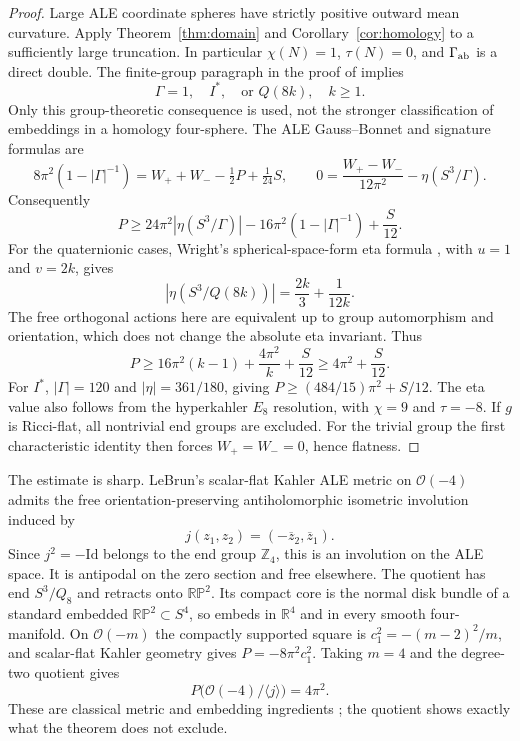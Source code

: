 \documentclass[11pt]{article}
\newcommand{\Z}{\mathbb Z}
\newcommand{\R}{\mathbb R}
\begin{document}
\begin{proof}
Large ALE coordinate spheres have strictly positive outward mean
curvature. Apply Theorem~\ref{thm:domain} and
Corollary~\ref{cor:homology} to a sufficiently large truncation.
In particular $\chi(N)=1$, $\tau(N)=0$, and $\Gamma_{\rm ab}$ is a
direct double. The finite-group paragraph in the proof of
\cite[Theorem 5.2]{Hillman} implies
\[
 \Gamma=1,\quad I^*,\quad\text{or }Q(8k),\quad k\ge1.
\]
Only this group-theoretic consequence is used, not the stronger
classification of embeddings in a homology four-sphere.
The ALE Gauss--Bonnet and signature formulas are
\[
 8\pi^2(1-|\Gamma|^{-1})=W_++W_- -\tfrac12P+\tfrac1{24}S,
 \qquad 0=\frac{W_+-W_-}{12\pi^2}-\eta(S^3/\Gamma).
\]
Consequently
\begin{equation}\label{eq:eta}
 P\ge24\pi^2|\eta(S^3/\Gamma)|
       -16\pi^2(1-|\Gamma|^{-1})+\frac{S}{12}.
\end{equation}
For the quaternionic cases, Wright's spherical-space-form eta formula
\cite[Lemma 1]{Wright}, with $u=1$ and $v=2k$, gives
\[
 |\eta(S^3/Q(8k))|=\frac{2k}{3}+\frac1{12k}.
\]
The free orthogonal actions here are equivalent up to group automorphism
and orientation, which does not change the absolute eta invariant.
Thus
\[
 P\ge16\pi^2(k-1)+\frac{4\pi^2}{k}+\frac{S}{12}
   \ge4\pi^2+\frac{S}{12}.
\]
For $I^*$, $|\Gamma|=120$ and $|\eta|=361/180$, giving
$P\ge(484/15)\pi^2+S/12$. The eta value also follows from the
hyperkahler $E_8$ resolution, with $\chi=9$ and $\tau=-8$.
If $g$ is Ricci-flat, all nontrivial end groups are excluded. For the
trivial group the first characteristic identity then forces
$W_+=W_-=0$, hence flatness.
\end{proof}

The estimate is sharp. LeBrun's scalar-flat Kahler ALE metric on
$\mathcal O(-4)$ admits the free orientation-preserving antiholomorphic
isometric involution induced by
\[
 j(z_1,z_2)=(-\overline z_2,\overline z_1).
\]
Since $j^2=-\mathrm{Id}$ belongs to the end group $\Z_4$, this is an
involution on the ALE space. It is antipodal on the zero section and
free elsewhere. The quotient has end $S^3/Q_8$ and retracts onto
$\mathbb{RP}^2$. Its compact core is the normal disk bundle of a
standard embedded $\mathbb{RP}^2\subset S^4$, so embeds in $\R^4$ and
in every smooth four-manifold. On $\mathcal O(-m)$ the compactly
supported square is $c_1^2=-(m-2)^2/m$, and scalar-flat Kahler geometry
gives $P=-8\pi^2c_1^2$. Taking $m=4$ and the degree-two quotient gives
\[
 P\bigl(\mathcal O(-4)/\langle j\rangle\bigr)=4\pi^2.
\]
These are classical metric and embedding ingredients
\cite{LeBrun88,Hillman}; the quotient shows exactly what the theorem
does not exclude.
\end{document}

